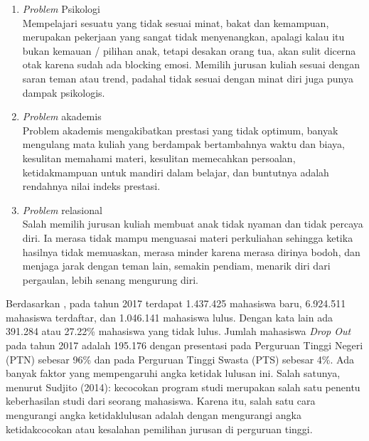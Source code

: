 \begin{enumerate}
    \item \textit{Problem} Psikologi \\
        Mempelajari sesuatu yang tidak sesuai minat, bakat dan kemampuan, merupakan pekerjaan yang sangat tidak menyenangkan, apalagi kalau itu bukan kemauan / pilihan anak, tetapi desakan orang tua, akan sulit dicerna otak karena sudah ada blocking emosi. Memilih jurusan kuliah sesuai dengan saran teman atau trend, padahal tidak sesuai dengan minat diri juga punya dampak psikologis.
    
    \item \textit{Problem} akademis \\
        Problem akademis mengakibatkan prestasi yang tidak optimum, banyak mengulang mata kuliah yang berdampak bertambahnya waktu dan biaya, kesulitan memahami materi, kesulitan memecahkan persoalan, ketidakmampuan untuk mandiri dalam belajar, dan buntutnya adalah rendahnya nilai indeks prestasi.
        
    \item \textit{Problem} relasional \\
        Salah memilih jurusan kuliah membuat anak tidak nyaman dan tidak percaya diri. Ia merasa tidak mampu menguasai materi perkuliahan sehingga ketika hasilnya tidak memuaskan, merasa minder karena merasa dirinya bodoh, dan menjaga jarak dengan teman lain, semakin pendiam, menarik diri dari pergaulan, lebih senang mengurung diri.
\end{enumerate}

Berdasarkan \cite{statistik:pendidikan:tinggi:2017}, pada tahun 2017 terdapat 1.437.425 mahasiswa baru, 6.924.511 mahasiswa terdaftar, dan 1.046.141 mahasiswa lulus. Dengan kata lain ada 391.284 atau 27.22\% mahasiswa yang tidak lulus. Jumlah mahasiswa \textit{Drop Out} pada tahun 2017 adalah 195.176 dengan presentasi pada Perguruan Tinggi Negeri (PTN) sebesar 96\% dan pada Perguruan Tinggi Swasta (PTS) sebesar 4\%. Ada banyak faktor yang mempengaruhi angka ketidak lulusan ini. Salah satunya, menurut Sudjito (2014): kecocokan program studi merupakan salah satu penentu keberhasilan studi dari seorang mahasiswa. Karena itu, salah satu cara mengurangi angka ketidaklulusan adalah dengan mengurangi angka ketidakcocokan atau kesalahan pemilihan jurusan di perguruan tinggi.


